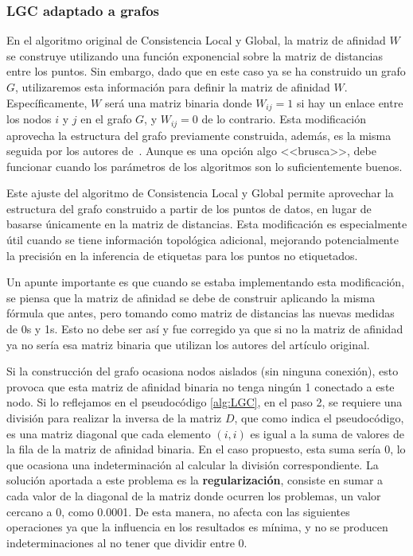 \subsubsection{LGC adaptado a grafos}\label{sec5:LGC}
En el algoritmo original de Consistencia Local y Global, la matriz de afinidad $W$ se construye utilizando una función exponencial sobre la matriz de distancias entre los puntos. Sin embargo, dado que en este caso ya se ha construido un grafo $G$, utilizaremos esta información para definir la matriz de afinidad $W$. Específicamente, $W$ será una matriz binaria donde $W_{ij}=1$ si hay un enlace entre los nodos $i$ y $j$ en el grafo $G$, y $W_{ij}=0$ de lo contrario. Esta modificación aprovecha la estructura del grafo previamente construida, además, es la misma seguida por los autores de~\cite{gbili}. Aunque es una opción algo <<brusca>>, debe funcionar cuando los parámetros de los algoritmos son lo suficientemente buenos.

Este ajuste del algoritmo de Consistencia Local y Global permite aprovechar la estructura del grafo construido a partir de los puntos de datos, en lugar de basarse únicamente en la matriz de distancias. Esta modificación es especialmente útil cuando se tiene información topológica adicional, mejorando potencialmente la precisión en la inferencia de etiquetas para los puntos no etiquetados.

Un apunte importante es que cuando se estaba implementando esta modificación, se piensa que la matriz de afinidad se debe de construir aplicando la misma fórmula que antes, pero tomando como matriz de distancias las nuevas medidas de 0s y 1s. Esto no debe ser así y fue corregido ya que si no la matriz de afinidad ya no sería esa matriz binaria que utilizan los autores del artículo original.

Si la construcción del grafo ocasiona nodos aislados (sin ninguna conexión), esto provoca que esta matriz de afinidad binaria no tenga ningún 1 conectado a este nodo. Si lo reflejamos en el pseudocódigo \ref{alg:LGC}, en el paso 2, se requiere una división para realizar la inversa de la matriz $D$, que como indica el pseudocódigo, es una matriz diagonal que cada elemento $(i, i)$ es igual a la suma de valores de la fila de la matriz de afinidad binaria. En el caso propuesto, esta suma sería 0, lo que ocasiona una indeterminación al calcular la división correspondiente. La solución aportada a este problema es la \textbf{regularización}, consiste en sumar a cada valor de la diagonal de la matriz donde ocurren los problemas, un valor cercano a 0, como 0.0001. De esta manera, no afecta con las siguientes operaciones ya que la influencia en los resultados es mínima, y no se producen indeterminaciones al no tener que dividir entre 0.

